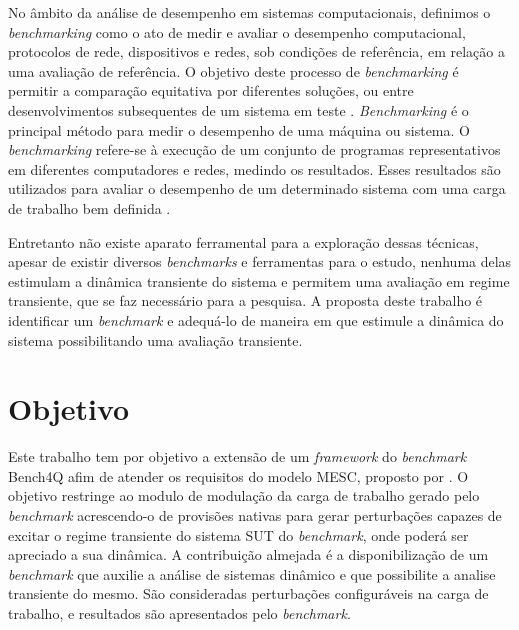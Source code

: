 No âmbito da análise de desempenho em sistemas computacionais, definimos o \textit{benchmarking} como o ato de medir e avaliar o desempenho computacional, protocolos de rede, dispositivos e redes, sob condições de referência, em relação a uma avaliação de referência. O objetivo deste processo de \textit{benchmarking} é permitir a comparação equitativa por diferentes soluções, ou entre desenvolvimentos subsequentes de um sistema em teste \textit{}. \textit{Benchmarking} é o principal método para medir o desempenho de uma máquina ou sistema. O \textit{benchmarking} refere-se à execução de um conjunto de programas representativos em diferentes computadores e redes, medindo os resultados. Esses resultados são utilizados para avaliar o desempenho de um determinado sistema com uma carga de trabalho bem definida \cite{Menasce2001}.

Entretanto não existe aparato ferramental para a exploração dessas técnicas, apesar de existir diversos \textit{benchmarks} e ferramentas para o estudo, nenhuma delas estimulam a dinâmica transiente do sistema e permitem uma avaliação em regime transiente, que se faz necessário para a pesquisa. A proposta deste trabalho é identificar um \textit{benchmark} e adequá-lo de maneira em que estimule a dinâmica do sistema possibilitando uma avaliação transiente.


\section{Objetivo}
Este trabalho tem por objetivo a extensão de um \textit{framework} do \textit{benchmark} Bench4Q afim de atender os requisitos do modelo MESC, proposto por . O objetivo restringe ao modulo de modulação da carga de trabalho gerado pelo \textit{benchmark} acrescendo-o de provisões nativas para gerar perturbações capazes de excitar o regime transiente do sistema SUT do \textit{benchmark}, onde poderá ser apreciado a sua dinâmica.  A contribuição almejada é a disponibilização de um \textit{benchmark} que auxilie a análise de sistemas dinâmico e que possibilite a analise transiente do mesmo. São consideradas perturbações configuráveis na carga de trabalho, e resultados são apresentados pelo \textit{benchmark}.


